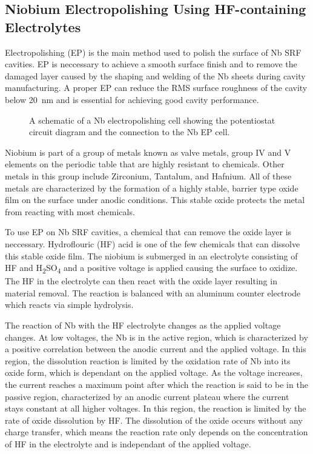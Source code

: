 \subsection{Niobium Electropolishing Using HF-containing Electrolytes}


Electropolishing (EP) is the main method used to polish the surface of Nb SRF cavities. EP is neccessary to achieve a smooth surface finish and to remove the damaged layer caused by the shaping and welding of the Nb sheets during cavity manufacturing. A proper EP can reduce the RMS surface roughness of the cavity below \qty{20}{\nano\meter} and is essential for achieving good cavity performance.

\begin{figure}[htbp]
    \centering
    
    
    \caption{A schematic of a Nb electropolishing cell showing the potentiostat circuit diagram and the connection to the Nb EP cell.}
    \label{fig:EP_diagram}
\end{figure}

Niobium is part of a group of metals known as valve metals, group IV and V elements on the periodic table that are highly resistant to chemicals. Other metals in this group include Zirconium, Tantalum, and Hafnium. All of these metals are characterized by the formation of a highly stable, barrier type oxide film on the surface under anodic conditions. This stable oxide protects the metal from reacting with most chemicals. 

To use EP on Nb SRF cavities, a chemical that can remove the oxide layer is neccessary. Hydroflouric (HF) acid is one of the few chemicals that can dissolve this stable oxide film. The niobium is submerged in an electrolyte consisting of HF and H\textsubscript{2}SO\textsubscript{4} and a positive voltage is applied causing the surface to oxidize. The HF in the electrolyte can then react with the oxide layer resulting in material removal. The reaction is balanced with an aluminum counter electrode which reacts via simple hydrolysis. 

The reaction of Nb with the HF electrolyte changes as the applied voltage changes. At low voltages, the Nb is in the active region, which is characterized by a positive correlation between the anodic current and the applied voltage. In this region, the dissolution reaction is limited by the oxidation rate of Nb into its oxide form, which is dependant on the applied voltage. As the voltage increases, the current reaches a maximum point after which the reaction is said to be in the passive region, characterized by an anodic current plateau where the current stays constant at all higher voltages. In this region, the reaction is limited by the rate of oxide dissolution by HF. The dissolution of the oxide occurs without any charge transfer, which means the reaction rate only depends on the concentration of HF in the electrolyte and is independant of the applied voltage\cite{ranjith2018anodic}.

